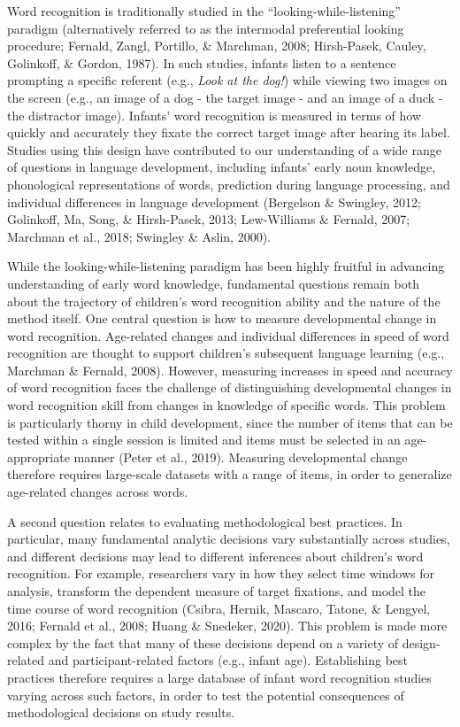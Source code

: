 \documentclass[10pt, letterpaper]{article}
\begin{document}
Word recognition is traditionally studied in the
``looking-while-listening'' paradigm (alternatively referred to as the
intermodal preferential looking procedure; Fernald, Zangl, Portillo, \&
Marchman, 2008; Hirsh-Pasek, Cauley, Golinkoff, \& Gordon, 1987). In
such studies, infants listen to a sentence prompting a specific referent
(e.g., \emph{Look at the dog!}) while viewing two images on the screen
(e.g., an image of a dog - the target image - and an image of a duck -
the distractor image). Infants' word recognition is measured in terms of
how quickly and accurately they fixate the correct target image after
hearing its label. Studies using this design have contributed to our
understanding of a wide range of questions in language development,
including infants' early noun knowledge, phonological representations of
words, prediction during language processing, and individual differences
in language development (Bergelson \& Swingley, 2012; Golinkoff, Ma,
Song, \& Hirsh-Pasek, 2013; Lew-Williams \& Fernald, 2007; Marchman et
al., 2018; Swingley \& Aslin, 2000).

While the looking-while-listening paradigm has been highly fruitful in
advancing understanding of early word knowledge, fundamental questions
remain both about the trajectory of children's word recognition ability
and the nature of the method itself. One central question is how to
measure developmental change in word recognition. Age-related changes
and individual differences in speed of word recognition are thought to
support children's subsequent language learning (e.g., Marchman \&
Fernald, 2008). However, measuring increases in speed and accuracy of
word recognition faces the challenge of distinguishing developmental
changes in word recognition skill from changes in knowledge of specific
words. This problem is particularly thorny in child development, since
the number of items that can be tested within a single session is
limited and items must be selected in an age-appropriate manner (Peter
et al., 2019). Measuring developmental change therefore requires
large-scale datasets with a range of items, in order to generalize
age-related changes across words.

A second question relates to evaluating methodological best practices.
In particular, many fundamental analytic decisions vary substantially
across studies, and different decisions may lead to different inferences
about children's word recognition. For example, researchers vary in how
they select time windows for analysis, transform the dependent measure
of target fixations, and model the time course of word recognition
(Csibra, Hernik, Mascaro, Tatone, \& Lengyel, 2016; Fernald et al.,
2008; Huang \& Snedeker, 2020). This problem is made more complex by the
fact that many of these decisions depend on a variety of design-related
and participant-related factors (e.g., infant age). Establishing best
practices therefore requires a large database of infant word recognition
studies varying across such factors, in order to test the potential
consequences of methodological decisions on study results.
\end{document}
